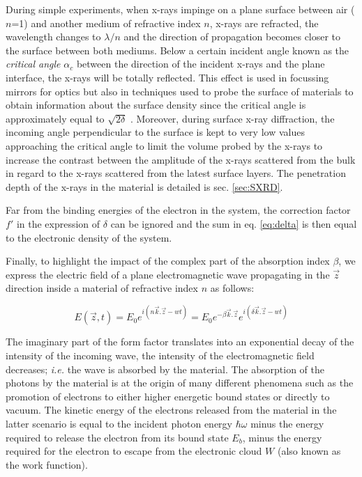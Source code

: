During simple experiments, when x-rays impinge on a plane surface between air ($n$=1) and another medium of refractive index $n$, x-rays are refracted, the wavelength changes to $\lambda/n$ and the direction of propagation becomes closer to the surface between both mediums.
Below a certain incident angle known as the \textit{critical angle} $\alpha_c$ between the direction of the incident x-rays and the plane interface, the x-rays will be totally reflected.
This effect is used in focussing mirrors for optics but also in techniques used to probe the surface of materials to obtain information about the surface density since the critical angle is approximately equal to $\sqrt{2\delta}$ \parencite{Willmott}.
Moreover, during surface x-ray diffraction, the incoming angle perpendicular to the surface is kept to very low values approaching the critical angle to limit the volume probed by the x-rays to increase the contrast between the amplitude of the x-rays scattered from the bulk in regard to the x-rays scattered from the latest surface layers.
The penetration depth of the x-rays in the material is detailed is sec. \ref{sec:SXRD}.

Far from the binding energies of the electron in the system, the correction factor $f'$ in the expression of $\delta$ can be ignored and the sum in eq. \ref{eq:delta} is then equal to the electronic density of the system.

Finally, to highlight the impact of the complex part of the absorption index $\beta$, we express the electric field of a plane electromagnetic wave propagating in the $\vec{z}$ direction inside a material of refractive index $n$ as follows:

\begin{equation}
    E(\vec{z}, t) = E_0 e^{i(n\vec{k}.\vec{z} - wt)} = E_0 e^{-\beta \vec{k}.\vec{z}} e^{i(\delta\vec{k}.\vec{z} - wt)}
\end{equation}

The imaginary part of the form factor translates into an exponential decay of the intensity of the incoming wave, the intensity of the electromagnetic field decreases; \textit{i.e.} the wave is absorbed by the material.
The absorption of the photons by the material is at the origin of many different phenomena such as the promotion of electrons to either higher energetic bound states or directly to vacuum.
The kinetic energy of the electrons released from the material in the latter scenario is equal to the incident photon energy $\hbar\omega$ minus the energy required to release the electron from its bound state $E_b$, minus the energy required for the electron to escape from the electronic cloud $W$ (also known as the work function).

